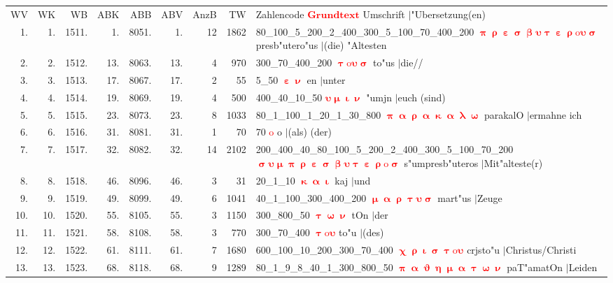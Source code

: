 \documentclass[a4paper,10pt,landscape]{article}
\begin{document}
\begin{tabular}{rrrrrrrrp{120mm}}
WV&WK&WB&ABK&ABB&ABV&AnzB&TW&Zahlencode \textcolor{red}{$\boldsymbol{Grundtext}$} Umschrift $|$"Ubersetzung(en)\\
1.&1.&1511.&1.&8051.&1.&12&1862&80\_100\_5\_200\_2\_400\_300\_5\_100\_70\_400\_200 \textcolor{red}{$\boldsymbol{\uppi\uprho\upepsilon\upsigma\upbeta\upsilon\uptau\upepsilon\uprho\mathrm{o}\upsilon\upsigma}$} presb"utero"us $|$(die) "Altesten\\
2.&2.&1512.&13.&8063.&13.&4&970&300\_70\_400\_200 \textcolor{red}{$\boldsymbol{\uptau\mathrm{o}\upsilon\upsigma}$} to"us $|$die//\\
3.&3.&1513.&17.&8067.&17.&2&55&5\_50 \textcolor{red}{$\boldsymbol{\upepsilon\upnu}$} en $|$unter\\
4.&4.&1514.&19.&8069.&19.&4&500&400\_40\_10\_50 \textcolor{red}{$\boldsymbol{\upsilon\upmu\upiota\upnu}$} "umjn $|$euch (sind)\\
5.&5.&1515.&23.&8073.&23.&8&1033&80\_1\_100\_1\_20\_1\_30\_800 \textcolor{red}{$\boldsymbol{\uppi\upalpha\uprho\upalpha\upkappa\upalpha\uplambda\upomega}$} parakalO $|$ermahne ich\\
6.&6.&1516.&31.&8081.&31.&1&70&70 \textcolor{red}{$\boldsymbol{\mathrm{o}}$} o $|$(als) (der)\\
7.&7.&1517.&32.&8082.&32.&14&2102&200\_400\_40\_80\_100\_5\_200\_2\_400\_300\_5\_100\_70\_200 \textcolor{red}{$\boldsymbol{\upsigma\upsilon\upmu\uppi\uprho\upepsilon\upsigma\upbeta\upsilon\uptau\upepsilon\uprho\mathrm{o}\upsigma}$} s"umpresb"uteros $|$Mit"alteste(r)\\
8.&8.&1518.&46.&8096.&46.&3&31&20\_1\_10 \textcolor{red}{$\boldsymbol{\upkappa\upalpha\upiota}$} kaj $|$und\\
9.&9.&1519.&49.&8099.&49.&6&1041&40\_1\_100\_300\_400\_200 \textcolor{red}{$\boldsymbol{\upmu\upalpha\uprho\uptau\upsilon\upsigma}$} mart"us $|$Zeuge\\
10.&10.&1520.&55.&8105.&55.&3&1150&300\_800\_50 \textcolor{red}{$\boldsymbol{\uptau\upomega\upnu}$} tOn $|$der\\
11.&11.&1521.&58.&8108.&58.&3&770&300\_70\_400 \textcolor{red}{$\boldsymbol{\uptau\mathrm{o}\upsilon}$} to"u $|$(des)\\
12.&12.&1522.&61.&8111.&61.&7&1680&600\_100\_10\_200\_300\_70\_400 \textcolor{red}{$\boldsymbol{\upchi\uprho\upiota\upsigma\uptau\mathrm{o}\upsilon}$} crjsto"u $|$Christus/Christi\\
13.&13.&1523.&68.&8118.&68.&9&1289&80\_1\_9\_8\_40\_1\_300\_800\_50 \textcolor{red}{$\boldsymbol{\uppi\upalpha\upvartheta\upeta\upmu\upalpha\uptau\upomega\upnu}$} paT"amatOn $|$Leiden\\

\end{tabular}
\end{document}
